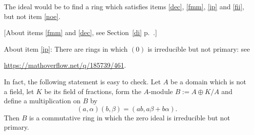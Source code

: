 \documentclass[parskip=half]{scrartcl}%
\begin{document}
The ideal would be to find a ring which satisfies items \ref{dec}, \ref{fmm}, \ref{ip} and \ref{fii}, but not item \ref{noe}.%

[About items \ref{fmm} and \ref{dec}, see Section~\ref{di} p.~\pageref{di}.]

About item \ref{ip}: There are rings in which $(0)$ is irreducible but not primary: see 

\href{https://mathoverflow.net/q/185739/461}{https://mathoverflow.net/q/185739/461}. 

In fact, the following statement is easy to check. Let $A$ be a domain which is not a field, let $K$ be its field of fractions, form the $A$-module $B:=A\oplus K/A$ and define a multiplication on $B$ by $$(a,\alpha)(b,\beta)=(ab,a\beta+b\alpha).$$ Then $B$ is a commutative ring in which the zero ideal is irreducible but not primary. 
\end{document}
